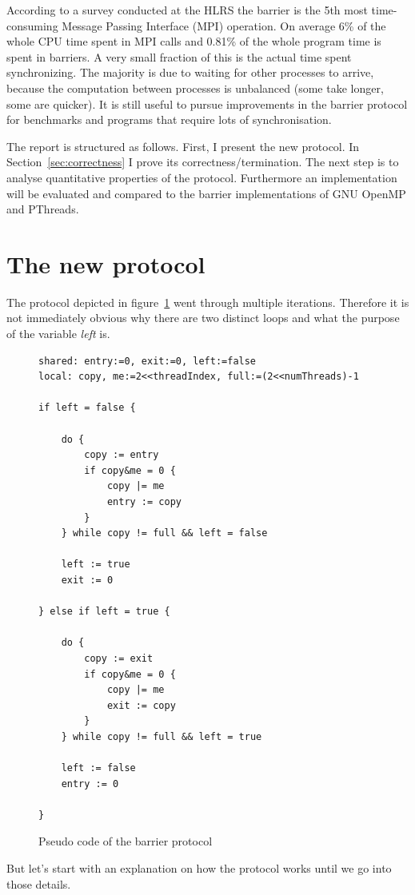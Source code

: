 \documentclass[a4paper, 10pt]{article}
\begin{document}
According to a survey conducted at the HLRS\cite{rab00} the barrier is the 5th most time-consuming Message Passing Interface\cite{mpi} (MPI) operation. On average 6\% of the whole CPU time spent in MPI calls and 0.81\% of the whole program time is spent in barriers. A very small fraction of this is the actual time spent synchronizing. The majority is due to waiting for other processes to arrive, because the computation between processes is unbalanced (some take longer, some are quicker). It is still useful to pursue improvements in the barrier protocol for benchmarks and programs that require lots of synchronisation.

The report is structured as follows. First, I present the new protocol. In Section~\ref{sec:correctness} I prove its correctness/termination. The next step is to analyse quantitative properties of the protocol. Furthermore an implementation will be evaluated and compared to the barrier implementations of GNU OpenMP\cite{gomp} and PThreads\cite{glibc}.

\section{The new protocol}
The protocol depicted in figure~\ref{fig:barrier-source-code} went through multiple iterations. Therefore it is not immediately obvious why there are two distinct loops and what the purpose of the variable \emph{left} is.
\begin{figure}[htbp]
	\centering
	\begin{lstlisting}
shared: entry:=0, exit:=0, left:=false
local: copy, me:=2<<threadIndex, full:=(2<<numThreads)-1

if left = false {

	do {
		copy := entry
		if copy&me = 0 {
			copy |= me
			entry := copy
		}
	} while copy != full && left = false

	left := true
	exit := 0

} else if left = true {

	do {
		copy := exit
		if copy&me = 0 {
			copy |= me
			exit := copy
		}
	} while copy != full && left = true

	left := false
	entry := 0

}
	\end{lstlisting}
	\caption{Pseudo code of the barrier protocol}
	\label{fig:barrier-source-code}
\end{figure}
But let's start with an explanation on how the protocol works until we go into those details.
\end{document}
